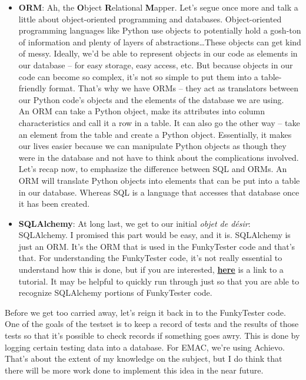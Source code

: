 \documentclass{report}
\begin{document}
\begin{appendices}
\begin{itemize}
	\item\textbf{ORM}: Ah, the \textbf{O}bject \textbf{R}elational \textbf{M}apper. Let's segue once more and talk a little about object-oriented programming and databases. Object-oriented programming languages like Python use objects to potentially hold a gosh-ton of information and plenty of layers of abstractions\ldots These objects can get kind of messy. Ideally, we'd be able to represent objects in our code as elements in our database -- for easy storage, easy access, etc. But because objects in our code can become so complex, it's not so simple to put them into a table-friendly format. That's why we have ORMs -- they act as translators between our Python code's objects and the elements of the database we are using.\\
	An ORM can take a Python object, make its attributes into column characteristics and call it a row in a table. It can also go the other way -- take an element from the table and create a Python object. Essentially, it makes our lives easier because we can manipulate Python objects as though they were in the database and not have to think about the complications involved.\\
	Let's recap now, to emphasize the difference between SQL and ORMs. An ORM will translate Python objects into elements that can be put into a table in our database. Whereas SQL is a language that accesses that database once it has been created.
	\item\textbf{SQLAlchemy}: At long last, we get to our initial \textit{objet de d\'esir}: SQLAlchemy. I promised this part would be easy, and it is. SQLAlchemy is just an ORM. It's the ORM that is used in the FunkyTester code and that's that.  For understanding the FunkyTester code, it's not really essential to understand how this is done, but if you are interested, \href{http://docs.sqlalchemy.org/en/rel_0_5/ormtutorial.html}{\textbf{here}} is a link to a tutorial. It may be helpful to quickly run through just so that you are able to recognize SQLAlchemy portions of FunkyTester code.
	\end{itemize}

Before we get too carried away, let's reign it back in to the FunkyTester code. One of the goals of the testset is to keep a record of tests and the results of those tests so that it's possible to check records if something goes awry. This is done by logging certain testing data into a database. For EMAC, we're using Achievo. That's about the extent of my knowledge on the subject, but I do think that there will be more work done to implement this idea in the near future.


\end{appendices}
\end{document}
